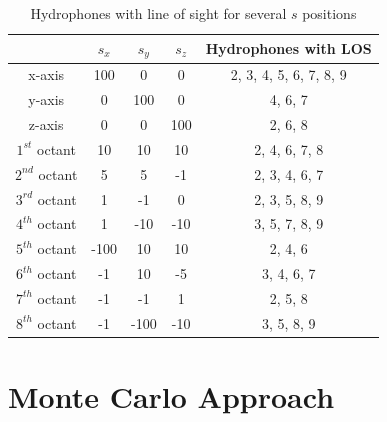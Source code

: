 \begin{table}[!htbp] %
	\begin{center}
		\begin{tabular}{ c c c c | c }
			\toprule
			\multicolumn{1}{c|}{} & \multicolumn{1}{c}{$s_x$} & $s_y$ & $s_z$ & Hydrophones with LOS\\
			\midrule
			\multicolumn{1}{c|}{x-axis} & \multirow{1}{*}{100} & 0 & 0 & 2, 3, 4, 5, 6, 7, 8, 9 \\
			\midrule
			\multicolumn{1}{c|}{y-axis} & \multirow{1}{*}{0} & 100 & 0 & 4, 6, 7 \\
			\midrule
			\multicolumn{1}{c|}{z-axis} & \multirow{1}{*}{0} & 0 & 100 & 2, 6, 8  \\
			\midrule
			\multicolumn{1}{c|}{$1^{st}$ octant} & \multirow{1}{*}{10} & 10 & 10 & 2, 4, 6, 7, 8 \\
			\midrule
			\multicolumn{1}{c|}{$2^{nd}$ octant} & \multirow{1}{*}{5} & 5 & -1 & 2, 3, 4, 6, 7 \\
			\midrule
			\multicolumn{1}{c|}{$3^{rd}$ octant} & \multirow{1}{*}{1} & -1 & 0 & 2, 3, 5, 8, 9  \\
			\midrule
			\multicolumn{1}{c|}{$4^{th}$ octant} & \multirow{1}{*}{1} & -10 & -10 & 3, 5, 7, 8, 9 \\
			\midrule
			\multicolumn{1}{c|}{$5^{th}$ octant} & \multirow{1}{*}{-100} & 10 & 10 & 2, 4, 6  \\
			\midrule
			\multicolumn{1}{c|}{$6^{th}$ octant} & \multirow{1}{*}{-1 } & 10 & -5 & 3, 4, 6, 7  \\
			\midrule
			\multicolumn{1}{c|}{$7^{th}$ octant} & \multirow{1}{*}{-1} & -1 & 1 & 2, 5, 8 \\
			\midrule
			\multicolumn{1}{c|}{$8^{th}$ octant} & \multirow{1}{*}{-1} & -100 & -10 & 3, 5, 8, 9 \\
			\bottomrule 
		\end{tabular}
		\caption{Hydrophones with line of sight for several $s$ positions}
		\label{tab:LOS-var-pos}
	\end{center}
\end{table}



\section{Monte Carlo Approach} \label{sec:config-perf}

